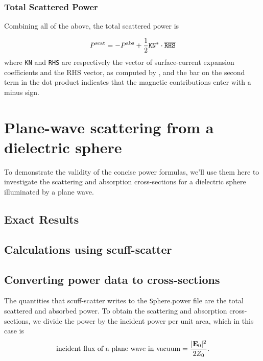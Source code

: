 \documentclass[letterpaper]{article}
\begin{document}
\subsubsection*{Total Scattered Power}

Combining all of the above, the total scattered power is 

$$P^{\hbox{\scriptsize{scat}}} = -P^{\hbox{\scriptsize{abs}}} + \frac{1}{2}\texttt{KN}^* \cdot \overline{\texttt{RHS}}$$
where \texttt{KN} and \texttt{RHS} are respectively the vector of 
surface-current expansion coefficients and the RHS vector, as computed
by \ls, and the bar on the second term in the dot product indicates that 
the magnetic contributions enter with a minus sign.

\section{Plane-wave scattering from a dielectric sphere}

To demonstrate the validity of the concise power formulas, we'll use
them here to investigate the scattering and absorption cross-sections
for a dielectric sphere illuminated by a plane wave.

\subsection*{Exact Results}

\subsection*{Calculations using {\sc scuff-scatter}}

\subsection*{Converting power data to cross-sections}
The quantities that {\sc scuff-scatter} writes to the
{\texttt Sphere.power} file are the total 
scattered and absorbed power. To obtain the scattering 
and absorption cross-sections, we divide the power by
the incident power per unit area, which in this case 
is 
$$\text{incident flux of a plane wave in vacuum}=\frac{|\mathbf{E}_0|^2}{2Z_0}.$$
\end{document}
